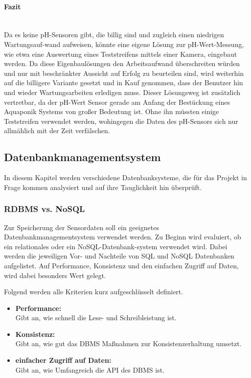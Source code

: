 \paragraph{Fazit} \mbox{} \\
Da es keine pH-Sensoren gibt, die billig sind und zugleich einen niedrigen Wartungsauf-wand aufweisen, könnte eine eigene Lösung zur pH-Wert-Messung, wie etwa eine Auswertung eines Teststreifens mittels einer Kamera, eingebaut werden. Da diese Eigenbaulösungen den Arbeitsaufwand überschreiten würden und nur mit beschränkter Aussicht auf Erfolg zu beurteilen sind, wird weiterhin auf die billigere Variante gesetzt und in Kauf genommen, dass der Benutzer hin und wieder Wartungsarbeiten erledigen muss. Dieser Lösungsweg ist zusätzlich vertretbar, da der pH-Wert Sensor gerade am Anfang der Bestückung eines Aquaponik Systems von großer Bedeutung ist. Ohne ihn müssten einige Teststreifen verwendet werden, wohingegen die Daten des pH-Sensors sich nur allmählich mit der Zeit verfälschen.
\newpage

\newpage
\subsection{Datenbankmanagementsystem}
In diesem Kapitel werden verschiedene Datenbanksysteme, die für das Projekt in Frage kommen analysiert und auf ihre Tauglichkeit hin überprüft.
\subsubsection{\gls{RDBMS} vs. \gls{NoSQL}}
Zur Speicherung der Sensordaten soll ein geeignetes Datenbankmanagementsystem verwendet werden. Zu Beginn wird evaluiert, ob ein relationales oder ein \gls{NoSQL}-Datenbank-system verwendet wird. Dabei werden die jeweiligen Vor- und Nachteile von \gls{SQL} und \gls{NoSQL} Datenbanken aufgelistet. Auf Performance, Konsistenz und den einfachen Zugriff auf Daten, wird dabei besonders Wert gelegt.

Folgend werden alle Kriterien kurz aufgeschlüsselt definiert.

\begin{itemize}
	\item \textbf{Performance:} \\Gibt an, wie schnell die Lese- und Schreibleistung ist.
	\item \textbf{Konsistenz:} \\Gibt an, wie gut das \gls{DBMS} Ma{\ss}nahmen zur Konsistenzerhaltung umsetzt.
	\item \textbf{einfacher Zugriff auf Daten:} \\Gibt an, wie Umfangreich die \gls{API} des \gls{DBMS} ist.
\end{itemize}

